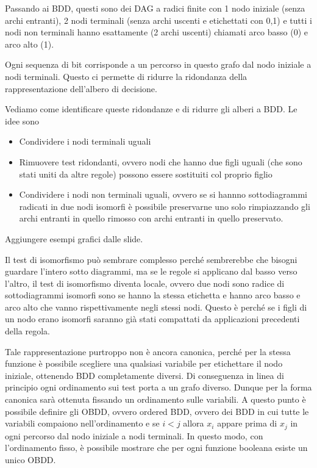 Passando ai BDD, questi sono dei DAG a radici finite con 1 nodo iniziale (senza archi entranti), 2 nodi terminali (senza archi uscenti e etichettati con 0,1) e tutti i nodi non terminali hanno esattamente (2 archi uscenti) chiamati arco basso (0) e arco alto (1).

Ogni sequenza di bit corrisponde a un percorso in questo grafo dal nodo iniziale a nodi terminali. Questo ci permette di ridurre la ridondanza della rappresentazione dell'albero di decisione.

Vediamo come identificare queste ridondanze e di ridurre gli alberi a BDD. Le idee sono
\begin{itemize}
  \item Condividere i nodi terminali uguali
  \item Rimuovere test ridondanti, ovvero nodi che hanno due figli uguali (che sono stati uniti da altre regole) possono essere sostituiti col proprio figlio
  \item Condividere i nodi non terminali uguali, ovvero se si hannno sottodiagrammi radicati in due nodi isomorfi è possibile preservarne uno solo rimpiazzando gli archi entranti in quello rimosso con archi entranti in quello preservato.
\end{itemize}

Aggiungere esempi grafici dalle slide.

Il test di isomorfismo può sembrare complesso perché sembrerebbe che bisogni guardare l'intero sotto diagrammi, ma se le regole si applicano dal basso verso l'altro, il test di isomorfismo diventa locale, ovvero due nodi sono radice di sottodiagrammi isomorfi sono se hanno la stessa etichetta e hanno arco basso e arco alto che vanno rispettivamente negli stessi nodi. Questo è perché se i figli di un nodo erano isomorfi saranno già stati compattati da applicazioni precedenti della regola.

Tale rappresentazione purtroppo non è ancora canonica, perché per la stessa funzione è possibile scegliere una qualsiasi variabile per etichettare il nodo iniziale, ottenendo BDD completamente diversi. Di conseguenza in linea di principio ogni ordinamento sui test porta a un grafo diverso. Dunque per la forma canonica sarà ottenuta fissando un ordinamento sulle variabili.
A questo punto è possibile definire gli OBDD, ovvero ordered BDD, ovvero dei BDD in cui tutte le variabili compaiono nell'ordinamento e se \(i<j\) allora \(x_i\) appare prima di \(x_j\) in ogni percorso dal nodo iniziale a nodi terminali. In questo modo, con l'ordinamento fisso, è possibile mostrare che per ogni funzione booleana esiste un unico OBDD\@.

